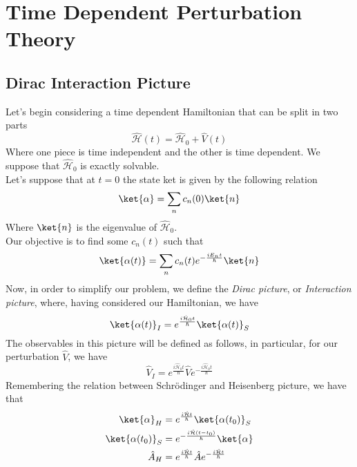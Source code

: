 \documentclass[a4paper, 11pt]{book}
\newcommand{\1}{\opr{\mathds{1}}}
\newcommand{\ham}{\mathcal{H}}
\newcommand{\opr}[1]{\hat{#1}}
\theoremstyle{plain}
\begin{document}
	\section{Time Dependent Perturbation Theory}
	\subsection{Dirac Interaction Picture}
	Let's begin considering a time dependent Hamiltonian that can be split in two parts
	\begin{equation}
		\opr{\ham}(t)=\opr{\ham}_0+\opr{V}(t)
		\label{eq:timedephampert}
	\end{equation}
	Where one piece is time independent and the other is time dependent. We suppose that $\opr{\ham}_0$ is exactly solvable.\\
	Let's suppose that at $t=0$ the state ket is given by the following relation
	\begin{equation}
		\ket{\alpha}=\sum_nc_n(0)\ket{n}
		\label{eq:statekettimedeppert}
	\end{equation}
	Where $\ket{n}$ is the eigenvalue of $\opr{\ham}_0$.\\
	Our objective is to find some $c_n(t)$ such that
	\begin{equation}
		\ket{\alpha(t)}=\sum_nc_n(t)e^{-\frac{iE_nt}{\hbar}}\ket{n}
		\label{eq:findthiskettdpt}
	\end{equation}
	Now, in order to simplify our problem, we define the \textit{Dirac picture}, or \textit{Interaction picture}, where, having considered our Hamiltonian, we have
	\begin{equation}
		\ket{\alpha(t)}_I=e^{\frac{i\opr{\ham}_0t}{\hbar}}\ket{\alpha(t)}_S
		\label{eq:intpicturetdp}
	\end{equation}
	The observables in this picture will be defined as follows, in particular, for our perturbation $\opr{V}$, we have
	\begin{equation}
		\opr{V}_I=e^{\frac{i\opr{\ham}_0t}{\hbar}}\opr{V}e^{-\frac{i\opr{\ham}_0t}{\hbar}}
		\label{eq:Vintpictdpt}
	\end{equation}
	Remembering the relation between Schrödinger and Heisenberg picture, we have that
	\begin{equation}
		\begin{aligned}
			\ket{\alpha}_H&=e^{\frac{i\opr{\ham} t}{\hbar}}\ket{\alpha(t_0)}_S\\
			\ket{\alpha(t_0)}_S&=e^{-\frac{i\opr{\ham} (t-t_0)}{\hbar}}\ket{\alpha}\\
			\opr{A}_H&=e^{\frac{i\opr{\ham} t}{\hbar}}\opr{A}e^{-\frac{i\opr{\ham} t}{\hbar}}
		\end{aligned}
		\label{eq:schrtoheisrep}
	\end{equation}
\end{document}

